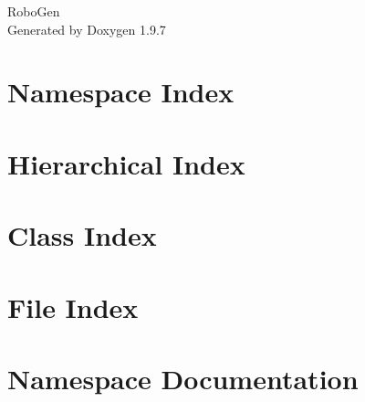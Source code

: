 \documentclass[twoside]{book}
\newcommand{\+}{\discretionary{\mbox{\scriptsize$\hookleftarrow$}}{}{}}
\newcommand{\clearemptydoublepage}{%
    \newpage{\pagestyle{empty}\cleardoublepage}%
  }
\begin{document}
  \raggedbottom
    \hypersetup{pageanchor=false,
                bookmarksnumbered=true,
                pdfencoding=unicode
               }
  \begin{titlepage}
  \vspace*{7cm}
  \begin{center}%
  {\Large Robo\+Gen}\\
  \vspace*{1cm}
  {\large Generated by Doxygen 1.9.7}\\
  \end{center}
  \end{titlepage}
  \clearemptydoublepage
  \tableofcontents
  \clearemptydoublepage
  \hypersetup{pageanchor=true}
\chapter{Namespace Index}

\chapter{Hierarchical Index}

\chapter{Class Index}

\chapter{File Index}

\chapter{Namespace Documentation}




\end{document}
